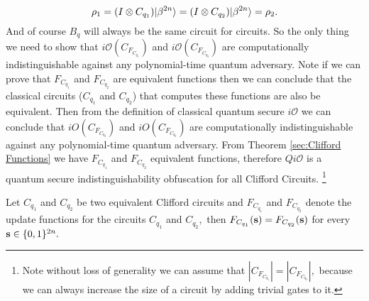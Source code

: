 \begin{itemize}
\begin{equation}
\label{eq:1}
\rho_1=(I\otimes C_{q_1}) {\lvert}\beta^{2n}\rangle=(I\otimes C_{q_2}) {\lvert}\beta^{2n}\rangle=\rho_2.
\end{equation}
And of course $B_q$ will always be the same circuit for circuits. So the only thing we need to show that $i\mathcal{O}(C_{F_{C_{q_1}}})$ and $i\mathcal{O}(C_{F_{C_{q_2}}})$ are computationally indistinguishable against any polynomial-time quantum adversary. Note if we can prove that $F_{C_{q_1}}$ and $F_{C_{q_2}}$ are equivalent functions then we can conclude that the classical circuits ($C_{q_1}$ and $C_{q_2}$) that computes these functions are also be equivalent. Then from the definition of classical quantum secure $i\mathcal{O}$ we can conclude that  $iO(C_{F_{C_{q_2}}})$ and $iO(C_{F_{C_{q_2}}})$ are computationally indistinguishable against any polynomial-time quantum adversary. From Theorem \ref{sec:Clifford Functions} we have $F_{C_{q_1}}$ and $F_{C_{q_2}}$ equivalent functions, therefore $Qi\mathcal{O}$ is a quantum secure indistinguishability obfuscation for all Clifford Circuits. \footnote{Note without loss of generality we can assume that $|C_{F_{C_{q_1}}}|=|C_{F_{C_{q_2}}}|,$ because we can always increase the size of a circuit by adding trivial gates to it. }

\end{itemize}


\begin{theorem}\label{sec:Clifford Functions}
Let $C_{q_1}$ and $C_{q_2}$ be two equivalent Clifford circuits and  $F_{C_{q_1}}$ and $F_{C_{q_2}}$  denote the update functions for the circuits $C_{q_1}$ and $C_{q_2},$ then $F_{C_{q_1}}({\bf s})=F_{C_{q_2}}({\bf s})$ for every ${\bf s}\in\{0,1\}^{2n}.$
\end{theorem}

